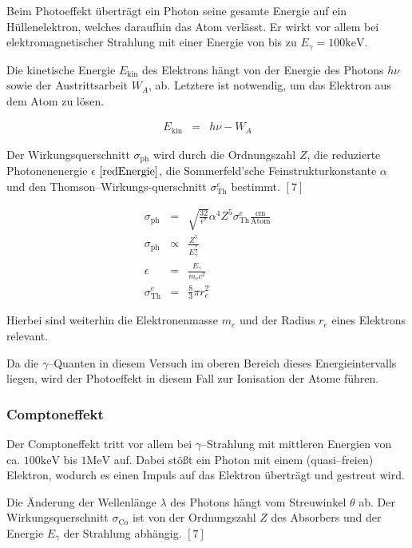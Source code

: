 \documentclass[12pt,a4paper]{scrartcl}
\numberwithin{equation}{section} %
\newcommand{\pu}[1]{\ensuremath{\mathrm{#1}}}
\begin{document}
Beim Photoeffekt überträgt ein Photon seine gesamte Energie auf ein Hüllenelektron, welches daraufhin das Atom verlässt. Er wirkt vor allem bei elektromagnetischer Strahlung mit einer Energie von bis zu $E_\gamma = \pu{100 keV}$.

Die kinetische Energie $E_\mathrm{kin}$ des Elektrons hängt von der Energie des Photons $h\nu$ sowie der Austrittsarbeit $W_A$, ab. Letztere ist notwendig, um das Elektron aus dem Atom zu lösen.

\begin{eqnarray}
    E_\mathrm{kin} &=& h\nu - W_A
\end{eqnarray}

\noindent
Der Wirkungsquerschnitt $\sigma_\mathrm{ph}$ wird durch die Ordnungszahl $Z$, die reduzierte Photonenenergie $\epsilon$ $\eqref{redEnergie}$, die Sommerfeld'sche Feinstrukturkonstante $\alpha$ und den Thomson--\allowbreak Wirkungs-querschnitt $\sigma_\mathrm{Th}^e$ bestimmt. $[7]$

\begin{eqnarray}
    \sigma_\mathrm{ph}
        &=& \sqrt{\frac{32}{\epsilon^7}}\alpha^4 Z^5
            \sigma_\mathrm{Th}^e \pu{\frac{cm}{Atom}} \\
    \sigma_\mathrm{ph}
        &\propto& \frac{Z^5}{E_\gamma^{\frac{7}{2}}} \\
    \epsilon &=& \frac{E_\gamma}{m_ec^2} \label{redEnergie} \\
    \sigma_\mathrm{Th}^e &=& \frac{8}{3} \pi r_e^2
\end{eqnarray}

\noindent
Hierbei sind weiterhin die Elektronenmasse $m_e$ und der Radius $r_e$ eines Elektrons relevant.

Da die $\gamma$--Quanten in diesem Versuch im oberen Bereich dieses Energieintervalls liegen, wird der Photoeffekt in diesem Fall zur Ionisation der Atome führen.

\hypertarget{comptoneffekt}{%
\subsubsection{Comptoneffekt}\label{comptoneffekt}}

Der Comptoneffekt tritt vor allem bei $\gamma$--Strahlung mit mittleren Energien von ca. $\pu{100 keV}$ bis $\pu{1 MeV}$ auf. Dabei stößt ein Photon mit einem (quasi--freien) Elektron, wodurch es einen Impuls auf das Elektron überträgt und gestreut wird.

Die Änderung der Wellenlänge $\lambda$ des Photons hängt vom Streuwinkel $\theta$ ab. Der Wirkungsquerschnitt $\sigma_\mathrm{Co}$ ist von der Ordnungszahl $Z$ des Absorbers und der Energie $E_\gamma$ der Strahlung abhängig. $[7]$
\end{document}
